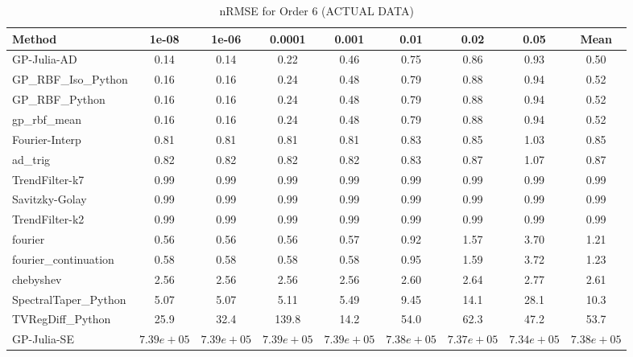 \begin{table}[htbp]
\centering
\caption{nRMSE for Order 6 (ACTUAL DATA)}
\label{tab:order_6}
\tiny
\begin{tabular}{lcccccccc}
\toprule
\textbf{Method} & \textbf{1e-08} & \textbf{1e-06} & \textbf{0.0001} & \textbf{0.001} & \textbf{0.01} & \textbf{0.02} & \textbf{0.05} & \textbf{Mean} \\
\midrule
GP-Julia-AD & 0.14 & 0.14 & 0.22 & 0.46 & 0.75 & 0.86 & 0.93 & 0.50 \\
GP_RBF_Iso_Python & 0.16 & 0.16 & 0.24 & 0.48 & 0.79 & 0.88 & 0.94 & 0.52 \\
GP_RBF_Python & 0.16 & 0.16 & 0.24 & 0.48 & 0.79 & 0.88 & 0.94 & 0.52 \\
gp_rbf_mean & 0.16 & 0.16 & 0.24 & 0.48 & 0.79 & 0.88 & 0.94 & 0.52 \\
Fourier-Interp & 0.81 & 0.81 & 0.81 & 0.81 & 0.83 & 0.85 & 1.03 & 0.85 \\
ad_trig & 0.82 & 0.82 & 0.82 & 0.82 & 0.83 & 0.87 & 1.07 & 0.87 \\
TrendFilter-k7 & 0.99 & 0.99 & 0.99 & 0.99 & 0.99 & 0.99 & 0.99 & 0.99 \\
Savitzky-Golay & 0.99 & 0.99 & 0.99 & 0.99 & 0.99 & 0.99 & 0.99 & 0.99 \\
TrendFilter-k2 & 0.99 & 0.99 & 0.99 & 0.99 & 0.99 & 0.99 & 0.99 & 0.99 \\
fourier & 0.56 & 0.56 & 0.56 & 0.57 & 0.92 & 1.57 & 3.70 & 1.21 \\
fourier_continuation & 0.58 & 0.58 & 0.58 & 0.58 & 0.95 & 1.59 & 3.72 & 1.23 \\
chebyshev & 2.56 & 2.56 & 2.56 & 2.56 & 2.60 & 2.64 & 2.77 & 2.61 \\
SpectralTaper_Python & 5.07 & 5.07 & 5.11 & 5.49 & 9.45 & 14.1 & 28.1 & 10.3 \\
TVRegDiff_Python & 25.9 & 32.4 & 139.8 & 14.2 & 54.0 & 62.3 & 47.2 & 53.7 \\
GP-Julia-SE & $7.39e+05$ & $7.39e+05$ & $7.39e+05$ & $7.39e+05$ & $7.38e+05$ & $7.37e+05$ & $7.34e+05$ & $7.38e+05$ \\
\bottomrule
\end{tabular}
\end{table}

